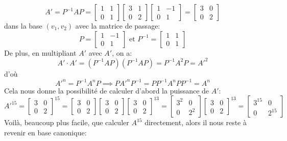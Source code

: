 \begin{ex}
\[
    A' = P^{-1}AP = \begin{bmatrix} 1 & 1 \\ 0 & 1 \end{bmatrix} \begin{bmatrix} 3 & 1 \\ 0 & 2 \end{bmatrix} \begin{bmatrix} 1 & -1 \\ 0 & 1 \end{bmatrix} = \begin{bmatrix} 3 & 0 \\ 0 & 2 \end{bmatrix} 
\] 
dans la base $(v_1, v_2)$ avec la matrice de passage:
\[
    P = \begin{bmatrix} 1 & -1\\ 0 & 1 \end{bmatrix} \text{ et } P^{-1} = \begin{bmatrix} 1 & 1 \\ 0 & 1  \end{bmatrix}
\] 
De plus, en multipliant $A'$ avec $A'$, on a:  
\[
    A' \cdot A' = (P^{-1}AP)(P^{-1}AP) = P^{-1}A^2P = A'^2
\] 
d'où
\[
    A'^n = P^{-1}A^{n}P \implies PA'^nP^{-1} = PP^{-1}A^{n}PP^{-1} = A^{n}
\] 
Cela nous donne la possibilité de calculer d'abord la puissance de $A'$:
 \[
     A'^{15} = \begin{bmatrix} 3 & 0 \\ 0 & 2 \end{bmatrix}^{15} = \begin{bmatrix} 3 & 0 \\ 0 & 2 \end{bmatrix}\begin{bmatrix} 3 & 0 \\ 0 & 2 \end{bmatrix}\begin{bmatrix} 3 & 0 \\ 0 & 2 \end{bmatrix}^{13} = \begin{bmatrix} 3^2 & 0 \\ 0 & 2^2 \end{bmatrix}\begin{bmatrix} 3 & 0 \\ 0 & 2 \end{bmatrix}^{13} = \begin{bmatrix} 3^{15} & 0 \\ 0 & 2^{15} \end{bmatrix}
\] 
Voilà, beaucoup plus facile, que calculer $A^15$ directement, alors il nous reste à revenir en base canonique:

\end{ex}
